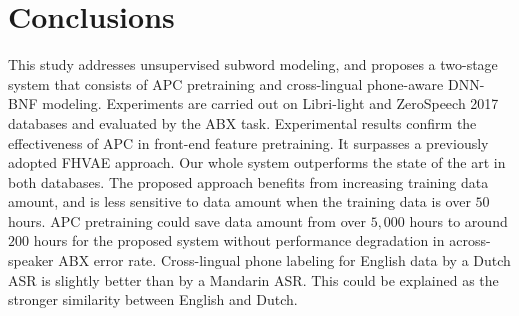 \documentclass[a4paper]{article}
\begin{document}

\section{Conclusions}
This study addresses unsupervised subword modeling, and proposes a two-stage system that consists of APC pretraining and cross-lingual phone-aware DNN-BNF modeling.  
Experiments are carried out on Libri-light and ZeroSpeech 2017 databases and evaluated by the ABX task. Experimental results confirm the effectiveness of APC in front-end feature pretraining. It surpasses a previously adopted FHVAE approach. Our whole system outperforms the state of the art in both databases. The proposed approach benefits from increasing training data amount, and is less sensitive to data amount when the training data is over $50$ hours. APC pretraining could save  data amount from over $5,000$ hours to around $200$ hours for the proposed system without performance degradation in across-speaker ABX error rate.  
Cross-lingual phone labeling for English data by a Dutch ASR is slightly better than by a Mandarin ASR. This could be explained as the stronger similarity between English and Dutch.  









\end{document}
